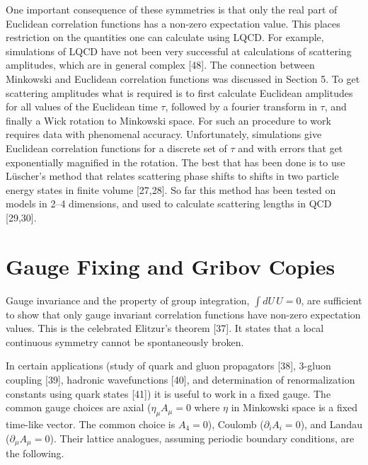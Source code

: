 One important consequence of these symmetries is that only the real part of
Euclidean correlation functions has a non-zero expectation value. This places
restriction on the quantities one can calculate using LQCD. For example,
simulations of LQCD have not been very successful at calculations of
scattering amplitudes, which are in general complex [48]. The connection
between Minkowski and Euclidean correlation functions was discussed in
Section 5. To get scattering amplitudes what is required is to first
calculate Euclidean amplitudes for all values of the Euclidean time $\tau$,
followed by a fourier transform in $\tau$, and finally a Wick rotation to
Minkowski space. For such an procedure to work requires data with phenomenal
accuracy. Unfortunately, simulations give Euclidean correlation functions for
a discrete set of $\tau$ and with errors that get exponentially magnified in
the rotation. The best that has been done is to use L\"uscher's method that
relates scattering phase shifts to shifts in two particle energy states in
finite volume [27,28]. So far this method has been tested on models in 2--4
dimensions, and used to calculate scattering lengths in QCD [29,30].

\section{Gauge Fixing and Gribov Copies}

Gauge invariance and the property of group integration, $\int dU\, U = 0$,
are sufficient to show that only gauge invariant correlation functions have
non-zero expectation values. This is the celebrated Elitzur's theorem [37].
It states that a local continuous symmetry cannot be spontaneously broken.

In certain applications (study of quark and gluon propagators [38], 3-gluon
coupling [39], hadronic wavefunctions [40], and determination of
renormalization constants using quark states [41]) it is useful to work in a
fixed gauge. The common gauge choices are axial ($\eta_\mu A_\mu = 0$ where
$\eta$ in Minkowski space is a fixed time-like vector. The common choice is
$A_4 = 0$), Coulomb ($\partial_i A_i = 0$), and Landau
($\partial_\mu A_\mu = 0$). Their lattice analogues, assuming periodic
boundary conditions, are the following.

